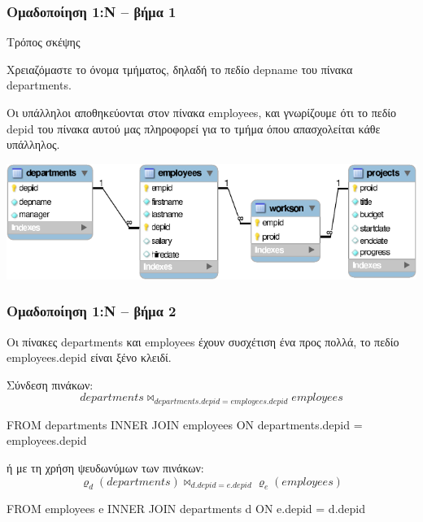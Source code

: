 \begin{frame}
\frametitle{Ομαδοποίηση 1:Ν -- βήμα 1}
\begin{minipage}{\wE}
  \begin{block}{Τρόπος σκέψης}
    \par Χρειαζόμαστε το όνομα τμήματος, δηλαδή το πεδίο {\ra depname} του πίνακα {\ra departments}.
    \par Οι υπάλληλοι αποθηκεύονται στον πίνακα {\ra employees},
και γνωρίζουμε ότι το πεδίο {\ra depid} του πίνακα αυτού μας πληροφορεί
για το τμήμα όπου απασχολείται κάθε υπάλληλος. 
  \end{block}
  \includegraphics[scale=0.9]{../common/companyREL.pdf}
\end{minipage}
\end{frame}


\begin{frame}
\frametitle{Ομαδοποίηση 1:Ν -- βήμα 2}
\begin{minipage}{\wE}
Οι πίνακες {\ra departments} και {\ra employees} έχουν συσχέτιση ένα προς πολλά,
το πεδίο {\ra employees.depid} είναι {\cee ξένο κλειδί}.
\pause
\begin{block}{Σύνδεση πινάκων:}
\[
  departments  \bowtie_{departments.depid  = employees.depid} employees
\]
\vspace*{-1em}
\en
\begin{SQL}
    FROM departments  INNER JOIN employees
         ON departments.depid  = employees.depid
\end{SQL}
\el
\end{block}
\pause
\begin{block}{ή με τη χρήση ψευδωνύμων των πινάκων:}
\[
   \varrho_{d}(departments)  \bowtie_{d.depid = e.depid}  \varrho_{e}(employees)
\]
\vspace*{-1em}
\en
\begin{SQL}
    FROM employees e INNER JOIN departments d
                     ON e.depid = d.depid
\end{SQL}
\el
\end{block}
\end{minipage}
\end{frame}



